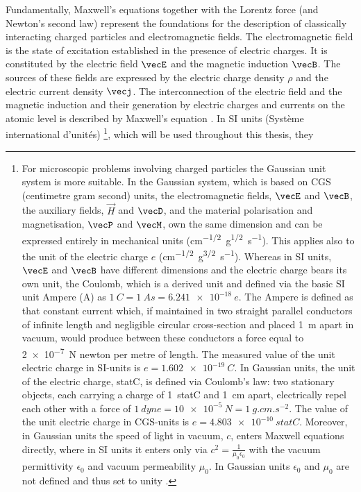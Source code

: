 \documentclass[
twoside,
openright,
titlepage,
numbers=noenddot,
headinclude,
fleqn,
a4paper,
footinclude=true,
cleardoublepage=empty,
abstractoff,
BCOR=5mm,
paper=a4,
fontsize=11pt,
british,ngerman,american,
]{scrreprt}
\begin{document}
Fundamentally, Maxwell's equations together with the Lorentz force
(and Newton's second law) represent the foundations for the
description of classically interacting charged particles and
electromagnetic fields.  The electromagnetic field is the state of
excitation established in the presence of electric charges.  It is
constituted by the electric field $\vecE$ and the magnetic induction
$\vecB$.  The sources of these fields are expressed by the electric
charge density $\rho$ and the electric current density $\vecj$.  The
interconnection of the electric field and the magnetic induction and
their generation by electric charges and currents on the atomic level
is described by Maxwell's equation \cite{Maxwell1864}.  In SI units
(Système international d’unités) \footnote{For microscopic problems
  involving charged particles the Gaussian unit system is more
  suitable.  In the Gaussian system, which is based on CGS (centimetre
  gram second) units, the electromagnetic fields, $\vecE$ and $\vecB$,
  the auxiliary fields, $\vec{H}$ and $\vecD$, and the material
  polarisation and magnetisation, $\vecP$ and $\vecM$, own the same
  dimension and can be expressed entirely in mechanical units
  (\si{cm^{-1/2}.g^{1/2}.s^{-1}}).  This applies also to the unit of
  the electric charge $e$ (\si{cm^{-1/2}.g^{3/2}.s^{-1}}).  Whereas in
  SI units, $\vecE$ and $\vecB$ have different dimensions and the
  electric charge bears its own unit, the Coulomb, which is a derived
  unit and defined via the basic SI unit Ampere (\si{A}) as $\SI{1}{C}
  =\SI{1}{As} =\SI{6.241e-18}{e}$.  The Ampere is defined as that
  constant current which, if maintained in two straight parallel
  conductors of infinite length and negligible circular cross-section
  and placed \SI{1}{m} apart in vacuum, would produce between these
  conductors a force equal to \SI{2e-7}{N} newton per metre of length.
  The measured value of the unit electric charge in SI-units is
  $e=\SI{1.602e-19}{C}$.  In Gaussian units, the unit of the electric
  charge, \si{statC}, is defined via Coulomb's law: two stationary
  objects, each carrying a charge of \SI{1}{statC} and \SI{1}{cm}
  apart, electrically repel each other with a force of
  $\SI{1}{dyne}=\SI{10e-5}{N}=\SI{1}{g.cm.s^{-2}}$.  The value of the
  unit electric charge in CGS-units is $e=\SI{4.803e-10}{statC}$.
  Moreover, in Gaussian units the speed of light in vacuum, $c$,
  enters Maxwell equations directly, where in SI units it enters only
  via $c^2=\frac{1}{\mu_0\epsilon_0}$ with the vacuum permittivity
  $\epsilon_0$ and vacuum permeability $\mu_0$.  In Gaussian units
  $\epsilon_0$ and $\mu_0$ are not defined and thus set to unity
  \cite{Jackson}.}, which will be used throughout this thesis, they
\end{document}
